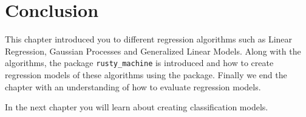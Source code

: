 \documentclass{book}
\begin{document}
%
%
%

\label{sec:classification}

\section{Conclusion}
This chapter introduced you to different regression algorithms such as Linear Regression, Gaussian Processes and Generalized Linear Models. Along with the algorithms, the package \lstinline{rusty_machine}  is introduced and how to create regression models of these algorithms using the package. Finally we end the chapter with an understanding of how to evaluate regression models.

In the next chapter you will learn about creating classification models.

\printbibliography
\end{document}
